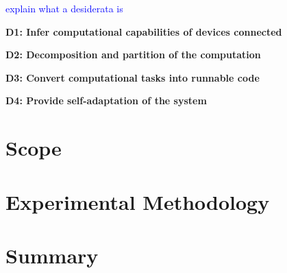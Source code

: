\textcolor{blue}{explain what a desiderata is}

\noindent
\textbf{D1: Infer computational capabilities of devices connected}

\noindent
\textbf{D2: Decomposition and partition of the computation}

\noindent
\textbf{D3: Convert computational tasks into runnable code}

\noindent
\textbf{D4: Provide self-adaptation of the system}

\section{Scope}\label{sec:scope}



\section{Experimental Methodology}\label{sec:exp_meth}

\section{Summary}\label{sec:stat_summary}
